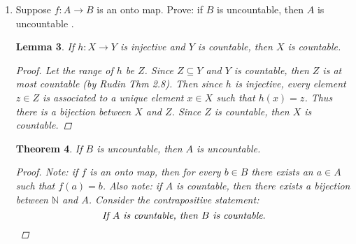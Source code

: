 \documentclass{amsart}
\newtheorem{theorem}{Theorem}
\newtheorem{lemma}[theorem]{Lemma}
\begin{document}
\begin{enumerate}[1.]
\begin{theorem}
	\begin{proof}
		First, assume $U$ is an open set in $(\mathbb{R},d)$. Then pick an arbitrary $x \in U$ and fix $\epsilon > 0$ such that
		\[
			N_{d,\epsilon}(x) \subseteq U
		\]
		We know from Lemma 14 that
		\[
			N_{d_\infty,\epsilon}(x) \subseteq N_{d,\epsilon}(x)
		\]
		So for every $\epsilon > 0$ we see that
		\begin{align*}
			N_{d_\infty,\epsilon}(x) \subseteq N_{d,\epsilon}(x) \subseteq U \\
			N_{d_\infty,\epsilon}(x) \subseteq U
		\end{align*}
		By universal generalization, for all $x \in U$, there exists an $\epsilon > 0$ such that 
		\[
			N_{d_\infty,\epsilon}(x) \subseteq U
		\]
		Thus, $U$ is an open set in $(\mathbb{R},d_\infty)$.
	\end{proof}
\end{theorem}
\begin{theorem}
	$U$ is an open set in $\mathbb R$ with the metric $d$ if and only if $U$ is an open
set in $\mathbb R$ with the Archimedean metric $d_{\infty}(x,y)=|x-y|$.
	\begin{proof}
		This follows from Theorem 16 and Theorem 17.
	\end{proof}
\end{theorem}
\newpage
\item Suppose $f: A \to B$ is an onto map. Prove: if $B$ is uncountable, then $A$ is uncountable .
\begin{lemma}
	If $h: X \to Y$ is injective and $Y$ is countable, then $X$ is countable.
	\begin{proof}
		Let the range of $h$ be $Z$. Since $Z \subseteq Y$ and $Y$ is countable, then $Z$ is at most countable (by Rudin Thm 2.8).
		Then since $h$ is injective, every element $z \in Z$ is associated to a unique element $x \in X$ such that $h(x) = z$. Thus there is a bijection between
		$X$ and $Z$. Since $Z$ is countable, then $X$ is countable.
	\end{proof}
\end{lemma}
\begin{theorem}
	If $B$ is uncountable, then $A$ is uncountable.
	\begin{proof} 
		Note: if $f$ is an onto map, then for every $b\in B$ there exists an $a \in A$ such that
		$f(a) = b$.
		Also note: if $A$ is countable, then there exists a bijection between $\mathbb{N}$ and $A$.
		Consider the contrapositive statement:
		\[
			\emph{If $A$ is countable, then $B$ is countable}.
		\]


\end{proof}
\end{theorem}
\end{enumerate}
\end{document}
